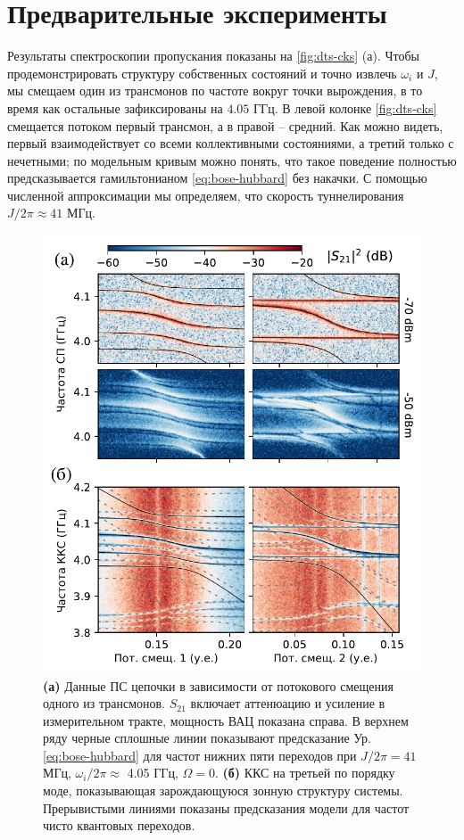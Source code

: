 \documentclass[14pt, a4paper]{extreport}
\numberwithin{equation}{section}
\begin{document}
\section{Предварительные эксперименты}

Результаты спектроскопии пропускания показаны на \autoref{fig:dts-cks} (а). Чтобы продемонстрировать структуру собственных состояний и точно извлечь $\omega_i$ и $J$, мы смещаем один из трансмонов по частоте вокруг точки вырождения, в то время как остальные зафиксированы на $4.05$ ГГц. В левой колонке \autoref{fig:dts-cks} смещается потоком первый трансмон, а в правой -- средний. Как можно видеть, первый взаимодействует со всеми коллективными состояниями, а третий только с нечетными; по модельным кривым можно понять, что такое поведение полностью предсказывается гамильтонианом \eqref{eq:bose-hubbard} без накачки. С помощью численной аппроксимации мы определяем, что скорость туннелирования $J/2\pi\approx 41$ МГц.

\begin{figure}[t]
	\centering
	\includegraphics[width=0.6\linewidth]{Pictures/DTS-CKS}
	\caption{\textbf{(а)} Данные ПС цепочки в зависимости от потокового смещения одного из трансмонов. $S_{21}$ включает аттенюацию и усиление в измерительном тракте, мощность ВАЦ показана справа. В верхнем ряду черные сплошные линии показывают предсказание Ур. \eqref{eq:bose-hubbard} для частот нижних пяти переходов при $J/2\pi = 41$ МГц, $\omega_i/2\pi \approx$ 4.05 ГГц, $\Omega=0$. \textbf{(б)} ККС на третьей по порядку моде, показывающая зарождающуюся зонную структуру системы. Прерывистыми линиями показаны предсказания модели для частот чисто квантовых переходов.}
	\label{fig:dts-cks}
\end{figure}
\end{document}
